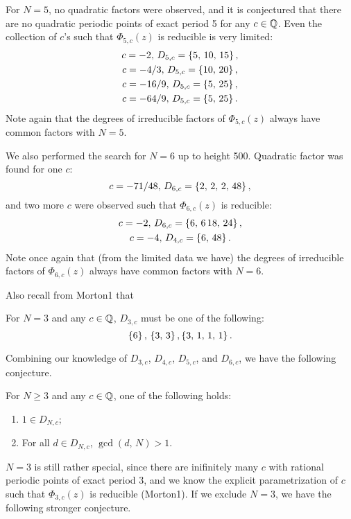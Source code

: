 For $N=5$, no quadratic factors were observed, and it is conjectured
that there are no quadratic periodic points of exact period 5 for any
$c \in \mathbb{Q}$. Even the collection of $c$'s such that $\Phi_{5,c}(z)$ is
reducible is very limited:
\[
\begin{gathered}
  c = -2,\, D_{5,c} = \left\{5,\, 10,\, 15\right\},\\
  c = -4/3,\, D_{5,c} = \left\{10,\, 20\right\},\\
  c = -16/9,\, D_{5,c} = \left\{5,\, 25\right\},\\
  c = -64/9,\, D_{5,c} = \left\{5,\, 25\right\}.
\end{gathered}
\]
Note again that the degrees of irreducible factors of $\Phi_{5,c}(z)$ always have common
factors with $N = 5$.

We also performed the search for $N = 6$ up to height 500. Quadratic
factor was found for one $c$:
\[
c = -71/48,\, D_{6,c} = \left\{2,\, 2,\, 2,\, 48\right\},
\]
and two more $c$ were observed such that $\Phi_{6,c}(z)$ is reducible:
\[
\begin{gathered}
  c = -2,\, D_{6,c} = \left\{6,\, 6\, 18,\, 24\right\},\\
  c = -4,\, D_{4,c} = \left\{6,\, 48\right\}.
\end{gathered}
\]
Note once again that (from the limited data we have) the degrees of
irreducible factors of $\Phi_{6,c}(z)$ always have common factors with
$N = 6$.

Also recall from Morton1 that
\begin{theorem}
  For $N = 3$ and any $c \in \mathbb{Q}$, $D_{3, c}$ must be one of the
  following:
  \[
  \left\{6\right\},\, \left\{3,\, 3\right\}, \left\{3,\, 1,\, 1,\, 1\right\}.
  \]
\end{theorem}

Combining our knowledge of $D_{3,c}$, $D_{4,c}$, $D_{5,c}$, and
$D_{6,c}$, we have the following conjecture.

\begin{conjecture}
  For $N \ge 3$ and any $c \in \mathbb{Q}$, one of the following holds:
  \begin{enumerate}
  \item $1 \in D_{N,c}$;
  \item For all $d \in D_{N,c}$, $\gcd(d,\, N) > 1$.
  \end{enumerate}
\end{conjecture}

$N = 3$ is still rather special, since there are inifinitely many $c$
with rational periodic points of exact period 3, and we know the
explicit parametrization of $c$ such that $\Phi_{3,c}(z)$ is
reducible (Morton1). If we exclude $N = 3$, we have the following
stronger conjecture.

